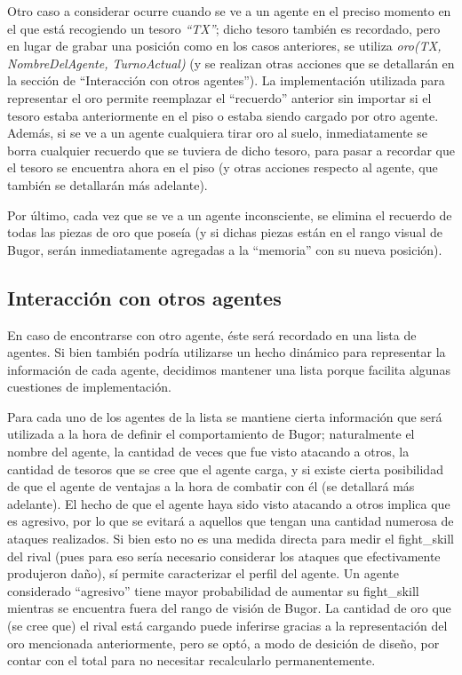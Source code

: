 \documentclass[a4paper,10pt,spanish]{article}
\begin{document}
		Otro caso a considerar ocurre cuando se ve a un agente en el preciso momento en el que est\'a recogiendo un tesoro \emph{``TX''}; dicho tesoro tambi\'en es recordado, pero en lugar de grabar una posici\'on como en los casos anteriores, se utiliza \emph{oro(TX, NombreDelAgente, TurnoActual)} (y se realizan otras acciones que se detallar\'an en la secci\'on de ``Interacci\'on con otros agentes''). La implementaci\'on utilizada para representar el oro permite reemplazar el ``recuerdo'' anterior sin importar si el tesoro estaba anteriormente en el piso o estaba siendo cargado por otro agente. Adem\'as, si se ve a un agente cualquiera tirar oro al suelo, inmediatamente se borra cualquier recuerdo que se tuviera de dicho tesoro, para pasar a recordar que el tesoro se encuentra ahora en el piso (y otras acciones respecto al agente, que tambi\'en se detallar\'an m\'as adelante).
		
		Por \'ultimo, cada vez que se ve a un agente inconsciente, se elimina el recuerdo de todas las piezas de oro que pose\'ia (y si dichas piezas est\'an en el rango visual de Bugor, ser\'an inmediatamente agregadas a la ``memoria'' con su nueva posici\'on).
		
	\subsection{Interacci\'on con otros agentes}
	
	En caso de encontrarse con otro agente, \'este ser\'a recordado en una lista de agentes. Si bien tambi\'en podr\'ia utilizarse un hecho din\'amico para representar la informaci\'on de cada agente, decidimos mantener una lista porque facilita algunas cuestiones de implementaci\'on.
	
	Para cada uno de los agentes de la lista se mantiene cierta informaci\'on que ser\'a utilizada a la hora de definir el comportamiento de Bugor; naturalmente el nombre del agente, la cantidad de veces que fue visto atacando a otros, la cantidad de tesoros que se cree que el agente carga, y si existe cierta posibilidad de que el agente de ventajas a la hora de combatir con \'el (se detallar\'a m\'as adelante). El hecho de que el agente haya sido visto atacando a otros implica que es agresivo, por lo que se evitar\'a a aquellos que tengan una cantidad numerosa de ataques realizados. Si bien esto no es una medida directa para medir el fight\_skill del rival (pues para eso ser\'ia necesario considerar los ataques que efectivamente produjeron da\~no), s\'i permite caracterizar el perfil del agente. Un agente considerado ``agresivo'' tiene mayor probabilidad de aumentar su fight\_skill mientras se encuentra fuera del rango de visi\'on de Bugor. La cantidad de oro que (se cree que) el rival est\'a cargando puede inferirse gracias a la representaci\'on del oro mencionada anteriormente, pero se opt\'o, a modo de desici\'on de dise\~no, por contar con el total para no necesitar recalcularlo permanentemente.
	
\end{document}
